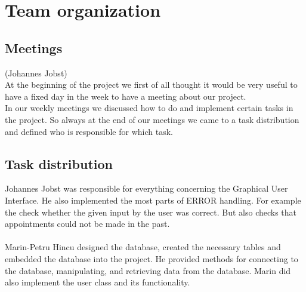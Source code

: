 \documentclass[a4paper, 12pt]{report}
\begin{document}
\chapter{Team organization}
\section{Meetings}
{\tiny (Johannes Jobst)\\}
At the beginning of the project we first of all thought it would be very useful 
to have a fixed day in the week to have a meeting about our project. \\
In our weekly meetings we discussed how to do and implement certain tasks in the project.
So always at the end of our meetings we came to a task distribution and defined who is
responsible for which task. 
\section{Task distribution}
Johannes Jobst was responsible for everything concerning the Graphical User Interface.
He also implemented the most parts of ERROR handling. For example the check whether the given
input by the user was correct. But also checks that appointments could not be made in the past. \\ \\
Marin-Petru Hincu designed the database, created the necessary tables and embedded the database into the project. He provided methods for connecting to the database, manipulating, and retrieving data from the database. Marin did also implement the user class and its functionality. \\ \\
\end{document}
